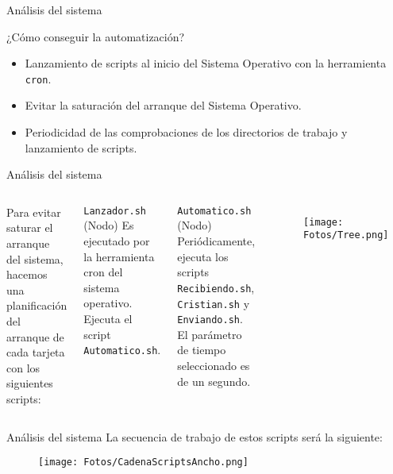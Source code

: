 \documentclass[aspectratio=169]{beamer}
\begin{document}
\begin{frame}{Análisis del sistema}
	\begin{block}{¿Cómo conseguir la automatización?}
		\begin{itemize}
			\item Lanzamiento de scripts al inicio del Sistema Operativo con la herramienta \texttt{cron}.
			\item Evitar la saturación del arranque del Sistema Operativo.
			\item Periodicidad de las comprobaciones de los directorios de trabajo y lanzamiento de scripts.
		\end{itemize}
	\end{block}
\end{frame}

\begin{frame}{Análisis del sistema}

\begin{columns}
	Para evitar saturar el arranque del sistema, hacemos una planificación del arranque de cada tarjeta con los siguientes scripts:
	\begin{block}{\texttt{Lanzador.sh} (Nodo)}
		Es ejecutado por la herramienta cron del sistema operativo.
		Ejecuta el script \texttt{Automatico.sh}.
	\end{block}
	\begin{block}{\texttt{Automatico.sh} (Nodo)}
		Periódicamente, ejecuta los scripts \texttt{Recibiendo.sh}, \texttt{Cristian.sh} y \texttt{Enviando.sh}.
		El parámetro de tiempo seleccionado es de un segundo. %
	\end{block}
	\begin{figure}[h]
		\centering
		\texttt{[image: Fotos/Tree.png]}
	\end{figure}
\end{columns}
\end{frame}

\begin{frame}{Análisis del sistema}
	La secuencia de trabajo de estos scripts será la siguiente:
	\begin{figure}[h]
		\centering
		\texttt{[image: Fotos/CadenaScriptsAncho.png]}
	\end{figure}
\end{frame}
\end{document}
